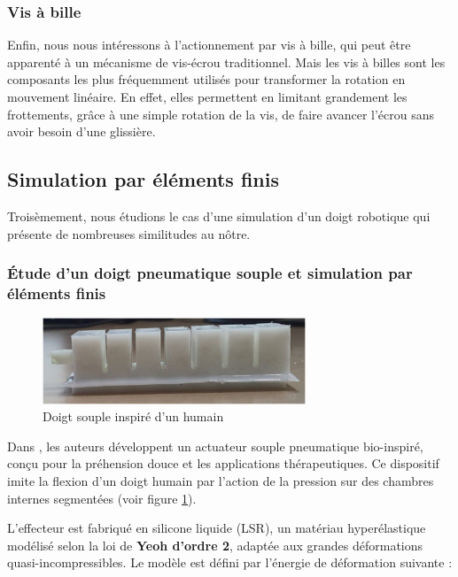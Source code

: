 \documentclass[a4paper, 11pt]{report}
\begin{document}
        \subsubsection{Vis à bille}

            Enfin, nous nous intéressons à l'actionnement par vis à bille, qui peut être apparenté à un mécanisme de vis-écrou traditionnel. Mais les vis à billes sont les composants les plus fréquemment utilisés pour transformer la rotation en mouvement linéaire. En effet, elles permettent en limitant grandement les frottements, grâce à une simple rotation de la vis, de faire avancer l'écrou sans avoir besoin d'une glissière. \cite{verl_double_2014}

    \subsection{Simulation par éléments finis}
    
        Troisèmement, nous étudions le cas d'une simulation d'un doigt robotique qui présente de nombreuses similitudes au nôtre.
        
        \subsubsection{Étude d'un doigt pneumatique souple et simulation par éléments finis}

            \begin{figure}
                \centering
                \includegraphics[width=0.7\textwidth]{Figures/doigt_souple.jpg}
                \caption{Doigt souple inspiré d'un humain \cite{bhat_numerical_2025}}
                \label{fig:doigt_souple}
            \end{figure}

            Dans \cite{bhat_numerical_2025}, les auteurs développent un actuateur souple pneumatique bio-inspiré, conçu pour la préhension douce et les applications thérapeutiques. Ce dispositif imite la flexion d’un doigt humain par l'action de la pression sur des chambres internes segmentées (voir figure \ref{fig:doigt_souple}).

            L'effecteur est fabriqué en silicone liquide (LSR), un matériau hyperélastique modélisé selon la loi de \textbf{Yeoh d'ordre 2}, adaptée aux grandes déformations quasi-incompressibles. Le modèle est défini par l'énergie de déformation suivante :
\end{document}
